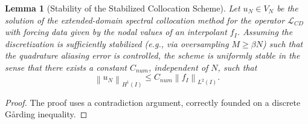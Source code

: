 \documentclass[pdflatex,sn-mathphys-num]{sn-jnl}%
\theoremstyle{thmstyleone}%
\newtheorem{lemma}{Lemma}
\newcommand{\norm}[1]{\left\lVert#1\right\rVert}
\begin{document}
\begin{lemma}[Stability of the Stabilized Collocation Scheme]
\label{lem:stability_proof}
Let $u_N \in V_N$ be the solution of the extended-domain spectral collocation method for the operator $\mathcal{L}_{CD}$ with forcing data given by the nodal values of an interpolant $f_I$. Assuming the discretization is sufficiently stabilized (e.g., via oversampling $M \ge \beta N$) such that the quadrature aliasing error is controlled, the scheme is uniformly stable in the sense that there exists a constant $C_{num}$, independent of $N$, such that
\begin{equation} \norm{u_N}_{H^1(I)} \le C_{num} \norm{f_I}_{L^2(I)}. \end{equation}
\end{lemma}
\begin{proof}
The proof uses a contradiction argument, correctly founded on a discrete G\r{a}rding inequality.


\end{proof}
\end{document}
